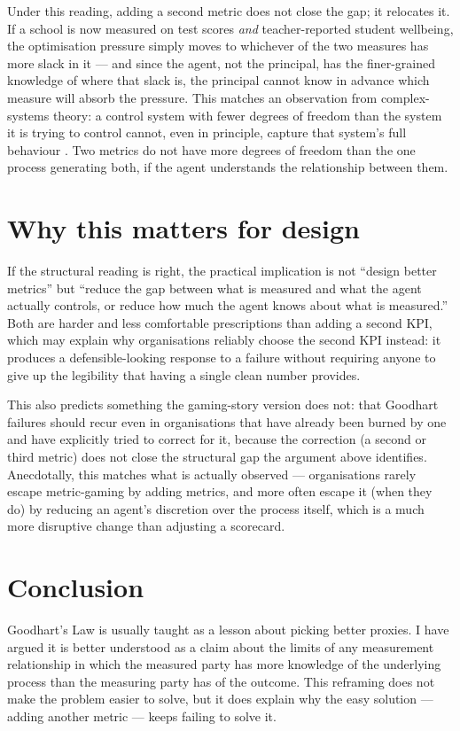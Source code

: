 \documentclass{term-paper}
\begin{document}
Under this reading, adding a second metric does not close the gap;
it relocates it. If a school is now measured on test scores
\emph{and} teacher-reported student wellbeing, the optimisation
pressure simply moves to whichever of the two measures has more slack
in it --- and since the agent, not the principal, has the finer-grained
knowledge of where that slack is, the principal cannot know in
advance which measure will absorb the pressure. This matches an
observation from complex-systems theory: a control system with fewer
degrees of freedom than the system it is trying to control cannot,
even in principle, capture that system's full behaviour
\parencite{ashby1956}. Two metrics do not have more degrees of freedom
than the one process generating both, if the agent understands the
relationship between them.

\section{Why this matters for design}

If the structural reading is right, the practical implication is not
``design better metrics'' but ``reduce the gap between what is
measured and what the agent actually controls, or reduce how much the
agent knows about what is measured.'' Both are harder and less
comfortable prescriptions than adding a second KPI, which may explain
why organisations reliably choose the second KPI instead: it produces
a defensible-looking response to a failure without requiring anyone
to give up the legibility that having a single clean number provides.

This also predicts something the gaming-story version does not: that
Goodhart failures should recur even in organisations that have
already been burned by one and have explicitly tried to correct for
it, because the correction (a second or third metric) does not close
the structural gap the argument above identifies. Anecdotally, this
matches what is actually observed --- organisations rarely escape
metric-gaming by adding metrics, and more often escape it (when they
do) by reducing an agent's discretion over the process itself, which
is a much more disruptive change than adjusting a scorecard.

\section{Conclusion}

Goodhart's Law is usually taught as a lesson about picking better
proxies. I have argued it is better understood as a claim about the
limits of any measurement relationship in which the measured party
has more knowledge of the underlying process than the measuring party
has of the outcome. This reframing does not make the problem easier
to solve, but it does explain why the easy solution --- adding another
metric --- keeps failing to solve it.

\printbibliography
\end{document}
